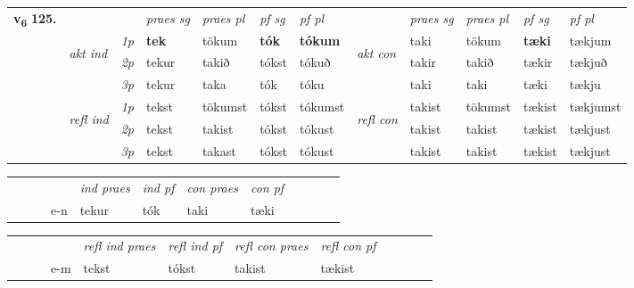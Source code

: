 \begin{tabular}{llllllllllll} \toprule
\multirow{4}{*}{{{\textbf{v{\textsubscript{6}}} \Large{\textbf{125.}}}}}  & &   &  \textit{praes sg}  & \textit{praes pl}  &\textit{ pf sg} & \textit{pf pl} &  &  \textit{praes sg}  & \textit{praes pl}  & \textit{pf sg} & \textit{pf pl } \\*
	\cmidrule{4-7} \cmidrule{9-12}
 & \multirow{3}{*}{\begin{turn}{90}\textit{akt ind}\end{turn}} & {\textit{1p}} & \textbf{tek} & tökum    & \textbf{tók} & \textbf{tókum} & \multirow{3}{*}{\begin{turn}{90}\textit{akt con}\end{turn}} &taki & tökum & \textbf{tæki} & tækjum\\*
& &  {\textit{2p}} &  tekur  & takið   & tókst & tókuð & & takir & takið & tækir & tækjuð \\*
& &  {\textit{3p}} & tekur & taka   & tók & tóku & & taki & taki& tæki & tækju  \\*
\cmidrule{4-7} \cmidrule{9-12}
 &\multirow{3}{*}{\begin{turn}{90}\textit{refl ind}\end{turn}} & {\textit{1p}} & tekst & tökumst    & tókst & tókumst & \multirow{3}{*}{\begin{turn}{90}\textit{refl con}\end{turn}}  &takist & tökumst & tækist & tækjumst\\*
 &&  {\textit{2p}} &  tekst  & takist   & tókst & tókust & &takist & takist & tækist & tækjust \\*
& &  {\textit{3p}} & tekst & takast   & tókst & tókust & & takist & takist& tækist & tækjust  \\*
\cmidrule{4-7} \cmidrule{9-12}
\end{tabular}


\begin{tabular}{llllllllllll}
 & &  & &  \textit{ind praes} & \textit{ind pf} & \textit{con praes} & \textit{con pf} \\*
&  & & e-n & tekur & tók & taki & tæki \\*
\cmidrule{5-9}
\end{tabular}


\begin{tabular}{llllllllllll}
 & &  & &  \textit{refl ind praes} & \textit{refl ind pf} & \textit{refl con praes} & \textit{refl con pf} \\*
&  & & e-m & tekst & tókst & takist & tækist \\*
\cmidrule{5-9}
\end{tabular}


